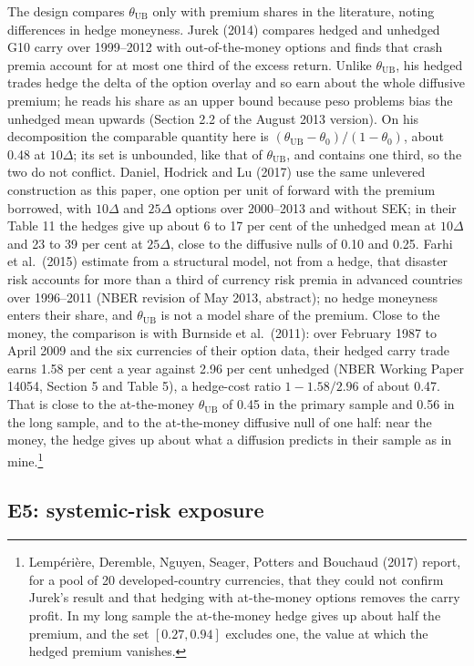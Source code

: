 \documentclass[11pt]{article}
\theoremstyle{result}
\newcommand{\thUB}{\theta_{\mathrm{UB}}}
\newcommand{\D}{\Delta}
\begin{document}
The design compares $\thUB$ only with premium shares in the literature, noting differences in hedge moneyness. Jurek (2014) compares hedged and unhedged G10 carry over 1999--2012 with out-of-the-money options and finds that crash premia account for at most one third of the excess return. Unlike $\thUB$, his hedged trades hedge the delta of the option overlay and so earn about the whole diffusive premium; he reads his share as an upper bound because peso problems bias the unhedged mean upwards (Section 2.2 of the August 2013 version). On his decomposition the comparable quantity here is $(\thUB-\theta_0)/(1-\theta_0)$, about 0.48 at $10\D$; its set is unbounded, like that of $\thUB$, and contains one third, so the two do not conflict. Daniel, Hodrick and Lu (2017) use the same unlevered construction as this paper, one option per unit of forward with the premium borrowed, with $10\D$ and $25\D$ options over 2000--2013 and without SEK; in their Table 11 the hedges give up about 6 to 17 per cent of the unhedged mean at $10\D$ and 23 to 39 per cent at $25\D$, close to the diffusive nulls of 0.10 and 0.25. Farhi et al.\ (2015) estimate from a structural model, not from a hedge, that disaster risk accounts for more than a third of currency risk premia in advanced countries over 1996--2011 (NBER revision of May 2013, abstract); no hedge moneyness enters their share, and $\thUB$ is not a model share of the premium. Close to the money, the comparison is with Burnside et al.\ (2011): over February 1987 to April 2009 and the six currencies of their option data, their hedged carry trade earns 1.58 per cent a year against 2.96 per cent unhedged (NBER Working Paper 14054, Section 5 and Table 5), a hedge-cost ratio $1-1.58/2.96$ of about 0.47. That is close to the at-the-money $\thUB$ of 0.45 in the primary sample and 0.56 in the long sample, and to the at-the-money diffusive null of one half: near the money, the hedge gives up about what a diffusion predicts in their sample as in mine.\footnote{Lemp\'eri\`ere, Deremble, Nguyen, Seager, Potters and Bouchaud (2017) report, for a pool of 20 developed-country currencies, that they could not confirm Jurek's result and that hedging with at-the-money options removes the carry profit. In my long sample the at-the-money hedge gives up about half the premium, and the set $[0.27,0.94]$ excludes one, the value at which the hedged premium vanishes.}

\subsection{E5: systemic-risk exposure}\label{sec:e5}
\end{document}
